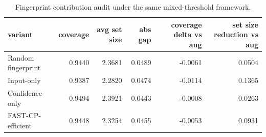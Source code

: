\begin{table}[t]
\centering
\small
\begin{tabular}{lrrrrr}
\toprule
variant & coverage & avg set size & abs gap & coverage delta vs aug & set size reduction vs aug \\
\midrule
Random fingerprint & 0.9440 & 2.3681 & 0.0489 & -0.0061 & 0.0504 \\
Input-only & 0.9387 & 2.2820 & 0.0474 & -0.0114 & 0.1365 \\
Confidence-only & 0.9494 & 2.3921 & 0.0443 & -0.0008 & 0.0263 \\
FAST-CP-efficient & 0.9448 & 2.3254 & 0.0455 & -0.0053 & 0.0931 \\
\bottomrule
\end{tabular}
\caption{Fingerprint contribution audit under the same mixed-threshold framework.}
\label{tab:fingerprint_variants}
\end{table}
